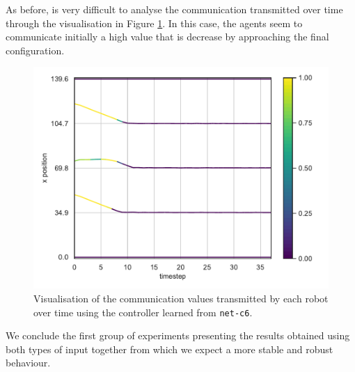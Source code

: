 As before, is very difficult to analyse the communication transmitted over time 
through the visualisation in Figure \ref{fig:net-c6comm}. In this case, the agents 
seem to communicate initially a high value  that is decrease by approaching the 
final configuration.
\begin{figure}[!htb]
	\centering
	\includegraphics[width=.65\textwidth]{contents/images/net-c6/4/plot-simulation-communication-4}
	\vspace{-0.5cm}
	\caption[Evaluation of the communication learned by 
	\texttt{net-c6}.]{Visualisation of the communication values transmitted by each 
		robot over time using the controller learned from \texttt{net-c6}.}	
	\label{fig:net-c6comm}
\end{figure}

We conclude the first group of experiments presenting the results obtained using 
both types of input together from which we expect a more stable and robust 
behaviour.

